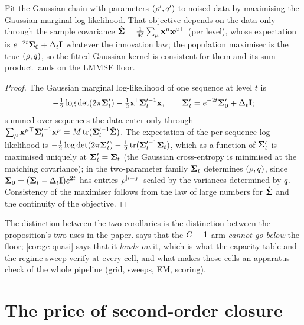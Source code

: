 \begin{corollary}
\label{cor:gc-quasi}
Fit the Gaussian chain with parameters $(\rho',q')$ to noised data by maximising the
Gaussian marginal log-likelihood. That objective depends on the data only through the
sample covariance $\hat{\mathbf{\Sigma}}=\frac1{M}\sum_\mu\mathbf{x}^\mu\mathbf{x}^{\mu\top}$ (per level), whose
expectation is $e^{-2t}\mathbf{\Sigma}_0+\Delta_t\mathbf{I}$ whatever the innovation law; the population
maximiser is the true $(\rho,q)$, so the fitted Gaussian kernel is consistent for
them and its sum-product lands on the LMMSE floor.
\end{corollary}
\begin{proof}
The Gaussian marginal log-likelihood of one sequence at level $t$ is
\[
  -\tfrac12\log\det(2\pi\mathbf{\Sigma}'_t)-\tfrac12\mathbf{x}^{\!\top}\mathbf{\Sigma}'^{-1}_t\mathbf{x},\qquad
  \mathbf{\Sigma}'_t=e^{-2t}\mathbf{\Sigma}'_0+\Delta_t\mathbf{I};
\]
summed over sequences the data enter only through
$\sum_\mu\mathbf{x}^{\mu\top}\mathbf{\Sigma}'^{-1}_t\mathbf{x}^\mu=M\operatorname{tr}(\mathbf{\Sigma}'^{-1}_t\hat{\mathbf{\Sigma}})$. The expectation of
the per-sequence log-likelihood is
$-\tfrac12\log\det(2\pi\mathbf{\Sigma}'_t)-\tfrac12\operatorname{tr}(\mathbf{\Sigma}'^{-1}_t\mathbf{\Sigma}_t)$, which as a function of $\mathbf{\Sigma}'_t$ is maximised uniquely at $\mathbf{\Sigma}'_t=\mathbf{\Sigma}_t$ (the Gaussian
cross-entropy is minimised at the matching covariance); in the two-parameter family
$\mathbf{\Sigma}_t$ determines $(\rho,q)$, since $\mathbf{\Sigma}_0=(\mathbf{\Sigma}_t-\Delta_t\mathbf{I})e^{2t}$ has entries
$\rho^{|i-j|}$ scaled by the variances determined by $q$. Consistency of the
maximiser follows from the law of large numbers for $\hat{\mathbf{\Sigma}}$ and the continuity of the
objective.
\end{proof}

The distinction between the two corollaries is the distinction between the
proposition's two uses in the paper.  says that the $C=1$ arm
\emph{cannot go below} the floor; \cref{cor:gc-quasi} says that it \emph{lands on} it,
which is what the capacity table and the regime sweep verify at every cell, and what
makes those cells an apparatus check of the whole pipeline (grid, sweeps, EM, scoring).

\section{The price of second-order closure}

